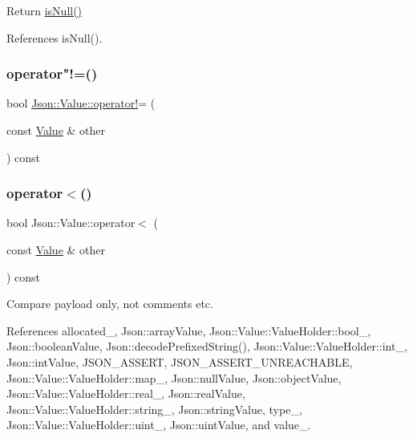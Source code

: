 Return \hyperlink{classJson_1_1Value_abde4070e21e46dc4f8203f66582cb19f_abde4070e21e46dc4f8203f66582cb19f}{is\+Null()} 



References is\+Null().

\mbox{\label{classJson_1_1Value_a86e95be072e515c48abc61dec63a1689_a86e95be072e515c48abc61dec63a1689}} 
\subsubsection{\texorpdfstring{operator"!=()}{operator!=()}}
{\footnotesize\ttfamily bool \hyperlink{classJson_1_1Value_a731b89fb4764c39ce2328e1707c822b9_a731b89fb4764c39ce2328e1707c822b9}{Json\+::\+Value\+::operator!}= (\begin{DoxyParamCaption}\item[{const \hyperlink{classJson_1_1Value}{Value} \&}]{other }\end{DoxyParamCaption}) const}

\mbox{\label{classJson_1_1Value_aac6bd14155b88ed2d39ef54820b39e49_aac6bd14155b88ed2d39ef54820b39e49}} 
\subsubsection{\texorpdfstring{operator$<$()}{operator<()}}
{\footnotesize\ttfamily bool Json\+::\+Value\+::operator$<$ (\begin{DoxyParamCaption}\item[{const \hyperlink{classJson_1_1Value}{Value} \&}]{other }\end{DoxyParamCaption}) const}



Compare payload only, not comments etc. 



References allocated\+\_\+, Json\+::array\+Value, Json\+::\+Value\+::\+Value\+Holder\+::bool\+\_\+, Json\+::boolean\+Value, Json\+::decode\+Prefixed\+String(), Json\+::\+Value\+::\+Value\+Holder\+::int\+\_\+, Json\+::int\+Value, J\+S\+O\+N\+\_\+\+A\+S\+S\+E\+RT, J\+S\+O\+N\+\_\+\+A\+S\+S\+E\+R\+T\+\_\+\+U\+N\+R\+E\+A\+C\+H\+A\+B\+LE, Json\+::\+Value\+::\+Value\+Holder\+::map\+\_\+, Json\+::null\+Value, Json\+::object\+Value, Json\+::\+Value\+::\+Value\+Holder\+::real\+\_\+, Json\+::real\+Value, Json\+::\+Value\+::\+Value\+Holder\+::string\+\_\+, Json\+::string\+Value, type\+\_\+, Json\+::\+Value\+::\+Value\+Holder\+::uint\+\_\+, Json\+::uint\+Value, and value\+\_\+.

